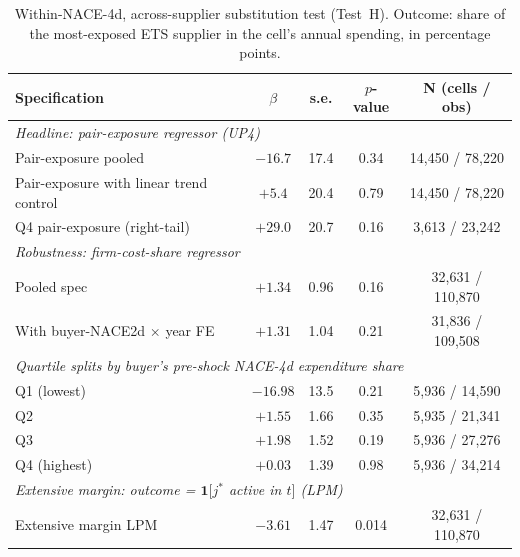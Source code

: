 \begin{table}[H]
    \centering
    \caption{Within-NACE-4d, across-supplier substitution test (Test~H). Outcome: share of the most-exposed ETS supplier in the cell's annual spending, in percentage points.}
    \label{tab:test_h_main}
    \begin{tabular}{lcccc}
        \toprule
        Specification & $\beta$ & s.e. & $p$-value & N (cells / obs) \\
        \midrule
        \multicolumn{5}{l}{\emph{Headline: pair-exposure regressor (UP4)}} \\
        Pair-exposure pooled                                & $-16.7$ & 17.4   & 0.34 & 14{,}450 / 78{,}220 \\
        Pair-exposure with linear trend control             & $+5.4$  & 20.4   & 0.79 & 14{,}450 / 78{,}220 \\
        Q4 pair-exposure (right-tail)                       & $+29.0$ & 20.7   & 0.16 & 3{,}613 / 23{,}242 \\
        \midrule
        \multicolumn{5}{l}{\emph{Robustness: firm-cost-share regressor}} \\
        Pooled spec                                         & $+1.34$ & 0.96   & 0.16 & 32{,}631 / 110{,}870 \\
        With buyer-NACE2d $\times$ year FE                  & $+1.31$ & 1.04   & 0.21 & 31{,}836 / 109{,}508 \\
        \midrule
        \multicolumn{5}{l}{\emph{Quartile splits by buyer's pre-shock NACE-4d expenditure share}} \\
        Q1 (lowest)                                         & $-16.98$ & 13.5  & 0.21 & 5{,}936 / 14{,}590 \\
        Q2                                                  & $+1.55$  & 1.66  & 0.35 & 5{,}935 / 21{,}341 \\
        Q3                                                  & $+1.98$  & 1.52  & 0.19 & 5{,}936 / 27{,}276 \\
        Q4 (highest)                                        & $+0.03$  & 1.39  & 0.98 & 5{,}936 / 34{,}214 \\
        \midrule
        \multicolumn{5}{l}{\emph{Extensive margin: outcome = $\mathbf{1}[j^*$ active in $t]$ (LPM)}} \\
        Extensive margin LPM                                & $-3.61$ & 1.47   & 0.014 & 32{,}631 / 110{,}870 \\
        \bottomrule
    \end{tabular}
\end{table}


